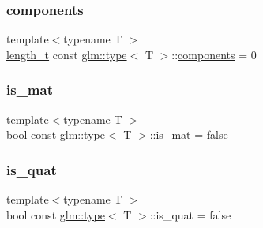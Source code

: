 \mbox{\label{structglm_1_1type_a678f2d75a5ec89fcaceb0934a52800b7}} 
\subsubsection{\texorpdfstring{components}{components}}
{\footnotesize\ttfamily template$<$typename T $>$ \\
\mbox{\hyperlink{namespaceglm_a090a0de2260835bee80e71a702492ed9}{length\+\_\+t}} const \mbox{\hyperlink{structglm_1_1type}{glm\+::type}}$<$ T $>$\+::\mbox{\hyperlink{_s_d_l__opengl__glext_8h_a3824c86dfa50d23068c74eafb87375c2}{components}} = 0\hspace{0.3cm}{\ttfamily [static]}}

\mbox{\label{structglm_1_1type_a21702de90bcb0212e4856a22d947bfa3}} 
\subsubsection{\texorpdfstring{is\+\_\+mat}{is\_mat}}
{\footnotesize\ttfamily template$<$typename T $>$ \\
bool const \mbox{\hyperlink{structglm_1_1type}{glm\+::type}}$<$ T $>$\+::is\+\_\+mat = false\hspace{0.3cm}{\ttfamily [static]}}

\mbox{\label{structglm_1_1type_ac0e332a405282f738486bc2134881df8}} 
\subsubsection{\texorpdfstring{is\+\_\+quat}{is\_quat}}
{\footnotesize\ttfamily template$<$typename T $>$ \\
bool const \mbox{\hyperlink{structglm_1_1type}{glm\+::type}}$<$ T $>$\+::is\+\_\+quat = false\hspace{0.3cm}{\ttfamily [static]}}

\mbox{\label{structglm_1_1type_a236fedee521c9783b686e86c0e1405e0}} 
